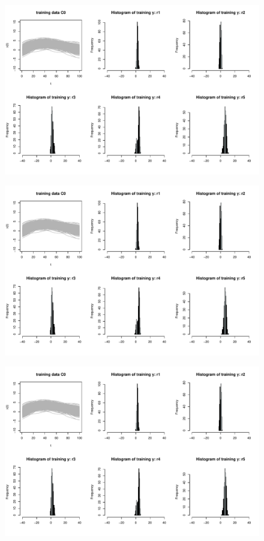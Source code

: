 \documentclass{article}
\begin{document}
\begin{figure}[H]
    \centering
    \includegraphics[scale = 0.55, page = 3]{figs/visualize_outliers.pdf}
\end{figure}


\begin{figure}[H]
    \centering
    \includegraphics[scale = 0.55, page = 4]{figs/visualize_outliers.pdf}
\end{figure}


\begin{figure}[H]
    \centering
    \includegraphics[scale = 0.55, page = 5]{figs/visualize_outliers.pdf}
\end{figure}
\end{document}
